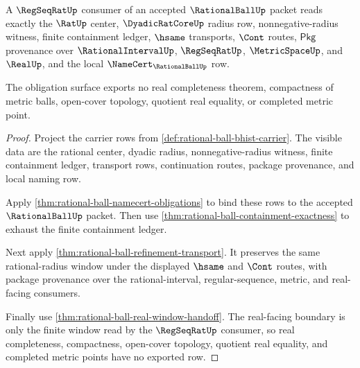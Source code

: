 \begin{theorem}
\label{thm:rationalball-regseqrat-window-obligations}
A $\RegSeqRatUp$ consumer of an accepted $\RationalBallUp$ packet reads exactly
the $\RatUp$ center, $\DyadicRatCoreUp$ radius row, nonnegative-radius witness,
finite containment ledger, $\hsame$ transports, $\Cont$ routes, $\mathsf{Pkg}$
provenance over $\RationalIntervalUp$, $\RegSeqRatUp$, $\MetricSpaceUp$, and
$\RealUp$, and the local $\NameCert_{\RationalBallUp}$ row.

The obligation surface exports no real completeness theorem, compactness of
metric balls, open-cover topology, quotient real equality, or completed metric
point.
\end{theorem}
\begin{proof}
Project the carrier rows from \autoref{def:rational-ball-bhist-carrier}. The
visible data are the rational center, dyadic radius, nonnegative-radius witness,
finite containment ledger, transport rows, continuation routes, package
provenance, and local naming row.

Apply \autoref{thm:rational-ball-namecert-obligations} to bind these rows to
the accepted $\RationalBallUp$ packet. Then use
\autoref{thm:rational-ball-containment-exactness} to exhaust the finite
containment ledger.

Next apply \autoref{thm:rational-ball-refinement-transport}. It preserves the
same rational-radius window under the displayed $\hsame$ and $\Cont$ routes,
with package provenance over the rational-interval, regular-sequence, metric,
and real-facing consumers.

Finally use \autoref{thm:rational-ball-real-window-handoff}. The real-facing
boundary is only the finite window read by the $\RegSeqRatUp$ consumer, so real
completeness, compactness, open-cover topology, quotient real equality, and
completed metric points have no exported row.
\end{proof}

